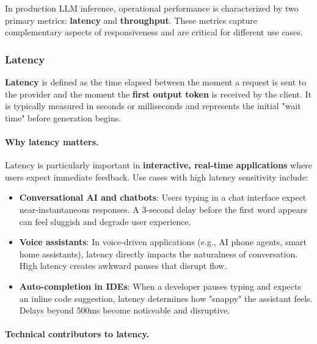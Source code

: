 \documentclass[english]{article}
\begin{document}
In production LLM inference, operational performance is characterized by two primary metrics: \textbf{latency} and \textbf{throughput}. These metrics capture complementary aspects of responsiveness and are critical for different use cases.

\subsubsection{Latency}

\textbf{Latency} is defined as the time elapsed between the moment a request is sent to the provider and the moment the \textbf{first output token} is received by the client. It is typically measured in seconds or milliseconds and represents the initial "wait time" before generation begins.

\paragraph{Why latency matters.}

Latency is particularly important in \textbf{interactive, real-time applications} where users expect immediate feedback. Use cases with high latency sensitivity include:
\begin{itemize}
    \item \textbf{Conversational AI and chatbots}: Users typing in a chat interface expect near-instantaneous responses. A 3-second delay before the first word appears can feel sluggish and degrade user experience.
    \item \textbf{Voice assistants}: In voice-driven applications (e.g., AI phone agents, smart home assistants), latency directly impacts the naturalness of conversation. High latency creates awkward pauses that disrupt flow.
    \item \textbf{Auto-completion in IDEs}: When a developer pauses typing and expects an inline code suggestion, latency determines how "snappy" the assistant feels. Delays beyond 500ms become noticeable and disruptive.
\end{itemize}

\paragraph{Technical contributors to latency.}
\end{document}
